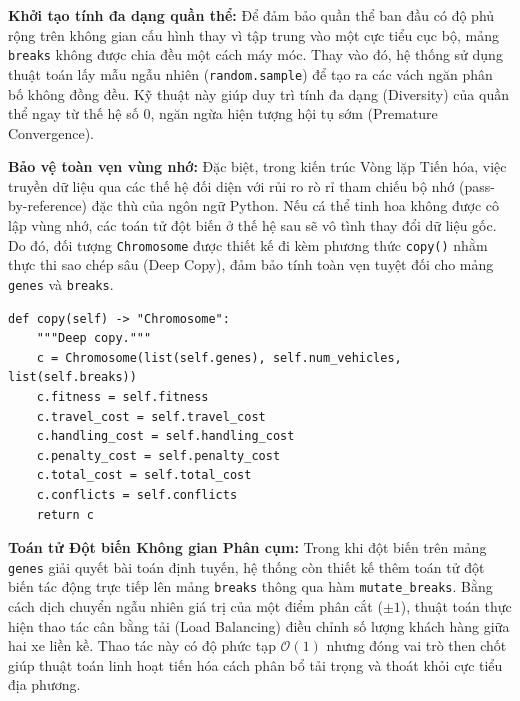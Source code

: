 \documentclass[12pt,a4paper]{article}
\numberwithin{figure}{subsection}
\begin{document}
\textbf{Khởi tạo tính đa dạng quần thể:} Để đảm bảo quần thể ban đầu có độ phủ rộng trên không gian cấu hình thay vì tập trung vào một cực tiểu cục bộ, mảng \texttt{breaks} không được chia đều một cách máy móc. Thay vào đó, hệ thống sử dụng thuật toán lấy mẫu ngẫu nhiên (\texttt{random.sample}) để tạo ra các vách ngăn phân bố không đồng đều. Kỹ thuật này giúp duy trì tính đa dạng (Diversity) của quần thể ngay từ thế hệ số 0, ngăn ngừa hiện tượng hội tụ sớm (Premature Convergence).

\textbf{Bảo vệ toàn vẹn vùng nhớ:} Đặc biệt, trong kiến trúc Vòng lặp Tiến hóa, việc truyền dữ liệu qua các thế hệ đối diện với rủi ro rò rỉ tham chiếu bộ nhớ (pass-by-reference) đặc thù của ngôn ngữ Python. Nếu cá thể tinh hoa không được cô lập vùng nhớ, các toán tử đột biến ở thế hệ sau sẽ vô tình thay đổi dữ liệu gốc. Do đó, đối tượng \texttt{Chromosome} được thiết kế đi kèm phương thức \texttt{copy()} nhằm thực thi sao chép sâu (Deep Copy), đảm bảo tính toàn vẹn tuyệt đối cho mảng \texttt{genes} và \texttt{breaks}.

\begin{verbatim}
def copy(self) -> "Chromosome":
    """Deep copy."""
    c = Chromosome(list(self.genes), self.num_vehicles, list(self.breaks))
    c.fitness = self.fitness
    c.travel_cost = self.travel_cost
    c.handling_cost = self.handling_cost
    c.penalty_cost = self.penalty_cost
    c.total_cost = self.total_cost
    c.conflicts = self.conflicts
    return c
\end{verbatim}

\textbf{Toán tử Đột biến Không gian Phân cụm:} Trong khi đột biến trên mảng \texttt{genes} giải quyết bài toán định tuyến, hệ thống còn thiết kế thêm toán tử đột biến tác động trực tiếp lên mảng \texttt{breaks} thông qua hàm \texttt{mutate\_breaks}. Bằng cách dịch chuyển ngẫu nhiên giá trị của một điểm phân cắt ($\pm 1$), thuật toán thực hiện thao tác cân bằng tải (Load Balancing) điều chỉnh số lượng khách hàng giữa hai xe liền kề. Thao tác này có độ phức tạp $\mathcal{O}(1)$ nhưng đóng vai trò then chốt giúp thuật toán linh hoạt tiến hóa cách phân bổ tải trọng và thoát khỏi cực tiểu địa phương.
\end{document}
